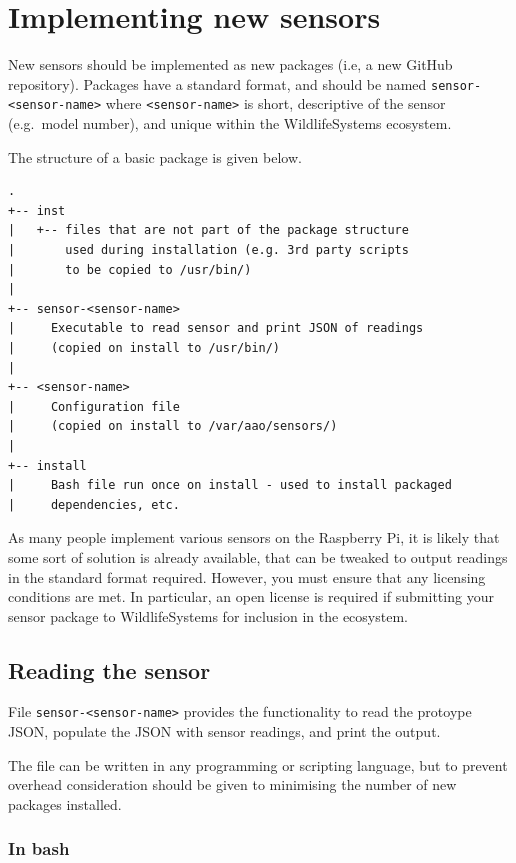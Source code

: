 \documentclass[
]{book}
\begin{document}
\chapter{Implementing new sensors}\label{implementing-new-sensors}

New sensors should be implemented as new packages (i.e, a new GitHub repository). Packages have a standard format, and should be named \texttt{sensor-\textless{}sensor-name\textgreater{}} where \texttt{\textless{}sensor-name\textgreater{}} is short, descriptive of the sensor (e.g.~model number), and unique within the WildlifeSystems ecosystem.

The structure of a basic package is given below.

\begin{verbatim}
.
+-- inst
|   +-- files that are not part of the package structure
|       used during installation (e.g. 3rd party scripts 
|       to be copied to /usr/bin/)
|
+-- sensor-<sensor-name>
|     Executable to read sensor and print JSON of readings
|     (copied on install to /usr/bin/)
|
+-- <sensor-name>
|     Configuration file 
|     (copied on install to /var/aao/sensors/)
|
+-- install
|     Bash file run once on install - used to install packaged
|     dependencies, etc.
\end{verbatim}

As many people implement various sensors on the Raspberry Pi, it is likely that some sort of solution is already available, that can be tweaked to output readings in the standard format required. However, you must ensure that any licensing conditions are met. In particular, an open license is required if submitting your sensor package to WildlifeSystems for inclusion in the ecosystem.

\section{Reading the sensor}\label{reading-the-sensor}

File \texttt{sensor-\textless{}sensor-name\textgreater{}} provides the functionality to read the protoype JSON, populate the JSON with sensor readings, and print the output.

The file can be written in any programming or scripting language, but to prevent overhead consideration should be given to minimising the number of new packages installed.

\subsection{In bash}\label{in-bash}
\end{document}
